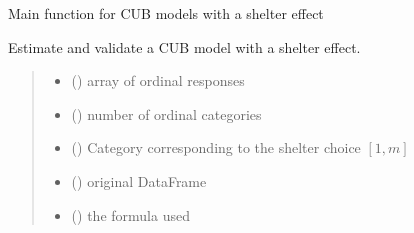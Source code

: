 \documentclass[letterpaper,10pt,english]{sphinxmanual}
\begin{document}

\begin{fulllineitems}
\label{\detokenize{cubmods:cubmods.cubsh.mle}}
\pysigstartsignatures
{}
\pysigstopsignatures
\sphinxAtStartPar
Main function for CUB models with a shelter effect

\sphinxAtStartPar
Estimate and validate a CUB model with a shelter effect.
\begin{quote}\begin{description}
\begin{itemize}
\item {} 
\sphinxAtStartPar
{} () \textendash{} array of ordinal responses

\item {} 
\sphinxAtStartPar
{} () \textendash{} number of ordinal categories

\item {} 
\sphinxAtStartPar
{} () \textendash{} Category corresponding to the shelter choice \([1,m]\)

\item {} 
\sphinxAtStartPar
{} () \textendash{} original DataFrame

\item {} 
\sphinxAtStartPar
{} () \textendash{} the formula used


\end{itemize}
\end{description}
\end{quote}
\end{fulllineitems}
\end{document}

